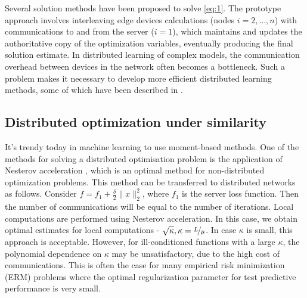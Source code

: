 \documentclass{article}
\begin{document}
Several solution methods have been proposed to solve \eqref{eq:1}. The prototype approach involves interleaving edge devices calculations (nodes $i = 2, \ldots, n$) with communications to and from the server ($i = 1$), which maintains and updates the authoritative copy of the optimization variables, eventually producing the final solution estimate. In distributed learning of complex models, the communication overhead between devices in the network often becomes a bottleneck. Such a problem makes it necessary to develop more efficient distributed learning methods, some of which have been described in \cite{konevcny2016federated, ghosh2020communication, smith2018cocoa, gorbunov2021marina}.

\subsection{Distributed optimization under similarity}

It's trendy today in machine learning to use moment-based methods. One of the methods for solving a distributed optimisation problem is the application of Nesterov acceleration \cite{nesterov2018lectures}, which is an optimal method for non-distributed optimization problems. This method can be transferred to distributed networks as follows. Consider $f = f_1 + \frac{\delta}{2} \|x\|_2^2$, where $f_1$ is the server loss function. Then the number of communications will be equal to the number of iterations. Local computations are performed using Nesterov acceleration. In this case, we obtain optimal estimates for local computations - $\sqrt{\kappa}, \kappa = \nicefrac{L}{\mu}$. In case $\kappa$ is small, this approach is acceptable. However, for ill-conditioned functions with a large $\kappa$, the polynomial dependence on $\kappa$ may be unsatisfactory, due to the high cost of communications. This is often the case for many empirical risk minimization (ERM) problems where the optimal regularization parameter for test predictive performance is very small.
\end{document}

